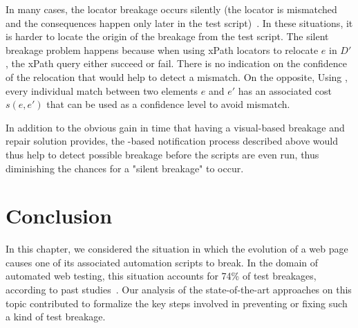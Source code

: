 In many cases, the locator breakage occurs silently (the locator is mismatched
and the consequences happen only later in the test
script)~\cite{stocco2018visual}. In these situations, it is harder to locate the
origin of the breakage from the test script. The silent breakage problem happens
because when using xPath locators to relocate $e$ in $D'$, the xPath query
either succeed or fail. There is no indication on the confidence of the
relocation that would help to detect a mismatch. On the opposite, Using
\erratum{}, every individual match between two elements $e$ and $e'$ has an
associated cost $s(e, e')$ that can be used as a confidence level to avoid
mismatch.

In addition to the obvious gain in time that having a visual-based breakage and
repair solution provides, the \erratum-based notification process described
above would thus help to detect possible breakage before the scripts are even
run, thus diminishing the chances for a "silent breakage" to occur.


\section{Conclusion}\label{erratum:sec:conclusion}
In this chapter, we considered the situation in which the evolution of a web page causes one of its associated automation scripts to break.
In the domain of automated web testing, this situation accounts for 74\% of test breakages, according to past studies~\cite{hammoudi2016record}.
% 
Our analysis of the state-of-the-art approaches on this topic contributed to formalize the key steps involved in preventing or fixing such a kind of test breakage.

